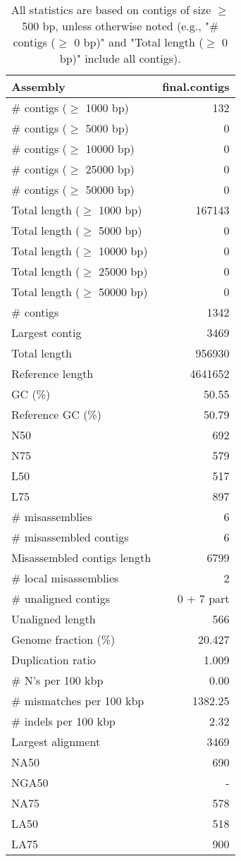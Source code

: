 \documentclass[12pt,a4paper]{article}
\begin{document}
\begin{table}[ht]
\begin{center}
\caption{All statistics are based on contigs of size $\geq$ 500 bp, unless otherwise noted (e.g., "\# contigs ($\geq$ 0 bp)" and "Total length ($\geq$ 0 bp)" include all contigs).}
\begin{tabular}{|l*{1}{|r}|}
\hline
Assembly & final.contigs \\ \hline
\# contigs ($\geq$ 1000 bp) & 132 \\ \hline
\# contigs ($\geq$ 5000 bp) & 0 \\ \hline
\# contigs ($\geq$ 10000 bp) & 0 \\ \hline
\# contigs ($\geq$ 25000 bp) & 0 \\ \hline
\# contigs ($\geq$ 50000 bp) & 0 \\ \hline
Total length ($\geq$ 1000 bp) & 167143 \\ \hline
Total length ($\geq$ 5000 bp) & 0 \\ \hline
Total length ($\geq$ 10000 bp) & 0 \\ \hline
Total length ($\geq$ 25000 bp) & 0 \\ \hline
Total length ($\geq$ 50000 bp) & 0 \\ \hline
\# contigs & 1342 \\ \hline
Largest contig & 3469 \\ \hline
Total length & 956930 \\ \hline
Reference length & 4641652 \\ \hline
GC (\%) & 50.55 \\ \hline
Reference GC (\%) & 50.79 \\ \hline
N50 & 692 \\ \hline
N75 & 579 \\ \hline
L50 & 517 \\ \hline
L75 & 897 \\ \hline
\# misassemblies & 6 \\ \hline
\# misassembled contigs & 6 \\ \hline
Misassembled contigs length & 6799 \\ \hline
\# local misassemblies & 2 \\ \hline
\# unaligned contigs & 0 + 7 part \\ \hline
Unaligned length & 566 \\ \hline
Genome fraction (\%) & 20.427 \\ \hline
Duplication ratio & 1.009 \\ \hline
\# N's per 100 kbp & 0.00 \\ \hline
\# mismatches per 100 kbp & 1382.25 \\ \hline
\# indels per 100 kbp & 2.32 \\ \hline
Largest alignment & 3469 \\ \hline
NA50 & 690 \\ \hline
NGA50 & - \\ \hline
NA75 & 578 \\ \hline
LA50 & 518 \\ \hline
LA75 & 900 \\ \hline
\end{tabular}
\end{center}
\end{table}
\end{document}
